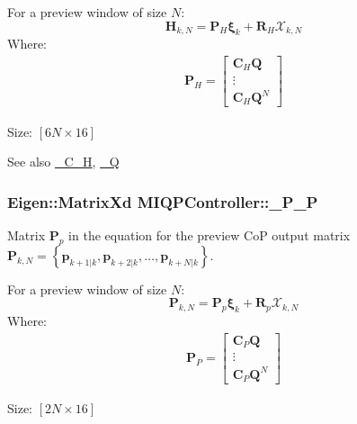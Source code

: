 \-For a preview window of size $N$\-: \[ \mathbf{H}_{k,N} = \mathbf{P}_H \mathbf{\xi}_k + \mathbf{R}_H \mathcal{X}_{k,N} \] \-Where\-: \begin{align*} \mathbf{P}_H = \left[\begin{array}{c} \mathbf{C}_H \mathbf{Q} \\ \vdots\\ \mathbf{C}_H \mathbf{Q}^N \end{array}\right] \end{align*}

\-Size\-: $[6N\times16]$

\begin{DoxySeeAlso}{\-See also}
\hyperlink{classMIQPController_a323718c0eaf8c8a7e159ea7f1ef5b72c}{\-\_\-\-C\-\_\-\-H}, \hyperlink{classMIQPController_ac6404f74d6002d6a0ca4bd2d0b41d548}{\-\_\-\-Q} 
\end{DoxySeeAlso}
\hypertarget{classMIQPController_a8243f4111abb4ad6c331ac147a844118}{
\subsubsection[{\-\_\-\-P\-\_\-\-P}]{\setlength{\rightskip}{0pt plus 5cm}\-Eigen\-::\-Matrix\-Xd {\bf \-M\-I\-Q\-P\-Controller\-::\-\_\-\-P\-\_\-\-P}}}\label{classMIQPController_a8243f4111abb4ad6c331ac147a844118}
\-Matrix $\mathbf{P}_p$ in the equation for the preview \-Co\-P output matrix $\mathbf{P}_{k,N} = \left\{ \mathbf{p}_{k+1|k}, \mathbf{p}_{k+2|k}, \dots, \mathbf{p}_{k+N|k} \right\}$.

\-For a preview window of size $N$\-: \[ \mathbf{P}_{k,N} = \mathbf{P}_p \mathbf{\xi}_k + \mathbf{R}_p \mathcal{X}_{k,N} \] \-Where\-: \begin{align*} \mathbf{P}_P = \left[\begin{array}{c} \mathbf{C}_P \mathbf{Q} \\ \vdots\\ \mathbf{C}_P \mathbf{Q}^N \end{array}\right] \end{align*}

\-Size\-: $[2N\times16]$

